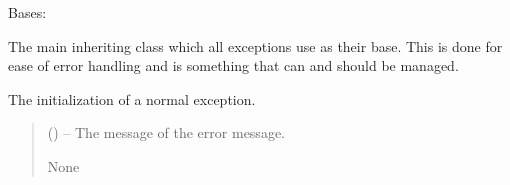 \documentclass[letterpaper,11pt,english]{sphinxmanual}
\begin{document}

\begin{savenotes}\begin{fulllineitems}
\label{\detokenize{code/opihiexarata.library.error:opihiexarata.library.error.ExarataException}}
\pysigstartsignatures
{}
\pysigstopsignatures
\sphinxAtStartPar
Bases: 

\sphinxAtStartPar
The main inheriting class which all exceptions use as their base. This
is done for ease of error handling and is something that can and should be
managed.

\begin{savenotes}\begin{fulllineitems}
\label{\detokenize{code/opihiexarata.library.error:opihiexarata.library.error.ExarataException.__init__}}
\pysigstartsignatures
{}
\pysigstopsignatures
\sphinxAtStartPar
The initialization of a normal exception.
\begin{quote}\begin{description}
\sphinxAtStartPar
{} () – The message of the error message.

\sphinxAtStartPar
None

\end{description}\end{quote}

\end{fulllineitems}\end{savenotes}


\end{fulllineitems}\end{savenotes}
\end{document}
